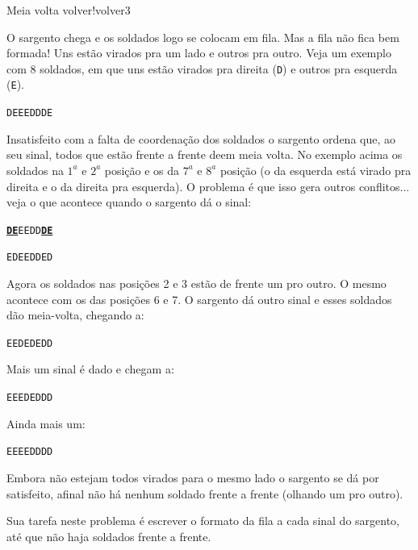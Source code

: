 \documentclass[12pt,a4paper,oneside]{article}
\begin{document}
\begin{problem}{Meia volta volver!}{volver}{3}

O sargento chega e os soldados logo se colocam em fila. Mas a fila não fica bem formada! Uns estão virados pra um lado e outros pra outro. Veja um exemplo com 8 soldados, em que uns estão virados pra direita (\texttt{D}) e outros pra esquerda (\texttt{E}).

\vspace{-6pt}
\begin{center}
    \texttt{DEEEDDDE}
\end{center}

Insatisfeito com a falta de coordenação dos soldados o sargento ordena que, ao seu sinal, todos que estão frente a frente deem meia volta. No exemplo acima os soldados na $1^a$ e $2^a$ posição e os da $7^a$ e $8^a$ posição (o da esquerda está virado pra direita e o da direita pra esquerda). O problema é que isso gera outros conflitos... veja o que acontece quando o sargento dá o sinal:

\begin{center}
    \texttt{\underline{\textbf{DE}}EEDD\underline{\textbf{DE}}}

    \texttt{EDEEDDED}
\end{center}

Agora os soldados nas posições 2 e 3 estão de frente um pro outro. O mesmo acontece com os das posições 6 e 7. O sargento dá outro sinal e esses soldados dão meia-volta, chegando a:

\vspace{-6pt}
\begin{center}
    \texttt{EEDEDEDD}
\end{center}

Mais um sinal é dado e chegam a:

\vspace{-6pt}
\begin{center}
    \texttt{EEEDEDDD}
\end{center}

Ainda mais um:

\vspace{-6pt}
\begin{center}
    \texttt{EEEEDDDD}
\end{center}

Embora não estejam todos virados para o mesmo lado o sargento se dá por satisfeito, afinal não há nenhum soldado frente a frente (olhando um pro outro).

Sua tarefa neste problema é escrever o formato da fila a cada sinal do sargento, até que não haja soldados frente a frente.



\end{problem}
\end{document}
